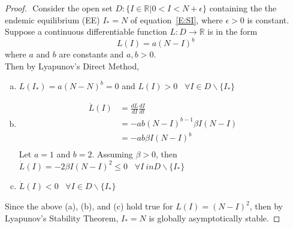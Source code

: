 \begin{proof} $ $\newline
Consider the open set $D: \{I \in \mathbb{R}| 0 < I < N+ \epsilon \}$ containing the the endemic equilibrium (EE) $I_* = N$ of equation~\eqref{E:SI}, where $\epsilon > 0$ is constant.
Suppose a continuous differentiable function $L:D\rightarrow \mathbb{R}$  is in the form
\begin{equation}
  L(I) = a(N-I)^b
\end{equation}
where $a$ and $b$ are constants and $a, b > 0$.\\

Then by Lyapunov's Direct Method,
\begin{enumerate}[(a)]
    \item $L(I_*) = a(N-N)^b = 0$ and $L(I)>0$ \, $\forall I\in D\backslash \{I_*\}$
    \item
    \begin{align*}
        \dot{L}(I)  &= \frac{dL}{dI} \frac{dI}{dt} \\
                    &= -ab(N-I)^{b-1}\beta I(N-I)\\
                    &= -ab\beta I(N-I)^b\\
    \end{align*}
    Let $a = 1$ and $b = 2$. Assuming $\beta>0$, then\\
    $\dot{L}(I) = -2\beta I(N-I)^2 \leq 0$ \, $\forall I\ in D \backslash \{I_*\}$
    \item $\dot{L}(I) < 0$ \, $\forall I\in D\backslash \{I_*\}$
\end{enumerate}

    Since the above (a), (b), and (c) hold true for $L(I) = (N-I)^2$, then by Lyapunov's Stability Theorem, $I_* = N$ is globally asymptotically stable.
\end{proof}
